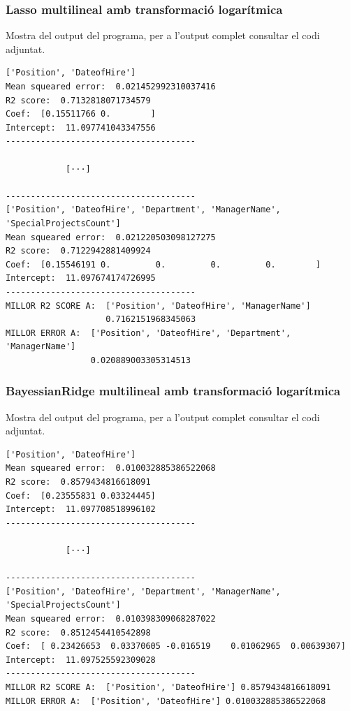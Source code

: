 \documentclass[a4paper, 11pt]{article}
\begin{document}
\subsubsection{Lasso multilineal amb transformació logarítmica}\label{reg_multi_lasso}
Mostra del output del programa, per a l'output complet consultar el codi adjuntat.
\begin{verbatim}
['Position', 'DateofHire']
Mean squeared error:  0.021452992310037416
R2 score:  0.7132818071734579
Coef:  [0.15511766 0.        ]
Intercept:  11.097741043347556
--------------------------------------

            [···]

--------------------------------------
['Position', 'DateofHire', 'Department', 'ManagerName', 'SpecialProjectsCount']
Mean squeared error:  0.021220503098127275
R2 score:  0.7122942881409924
Coef:  [0.15546191 0.         0.         0.         0.        ]
Intercept:  11.097674174726995
--------------------------------------
MILLOR R2 SCORE A:  ['Position', 'DateofHire', 'ManagerName'] 
                    0.7162151968345063
MILLOR ERROR A:  ['Position', 'DateofHire', 'Department', 'ManagerName']
                 0.020889003305314513
\end{verbatim}
\subsubsection{BayessianRidge multilineal amb transformació logarítmica} \label{reg_multi_bay}
Mostra del output del programa, per a l'output complet consultar el codi adjuntat.
\begin{verbatim}
['Position', 'DateofHire']
Mean squeared error:  0.010032885386522068
R2 score:  0.8579434816618091
Coef:  [0.23555831 0.03324445]
Intercept:  11.097708518996102
--------------------------------------

            [···]

--------------------------------------
['Position', 'DateofHire', 'Department', 'ManagerName', 'SpecialProjectsCount']
Mean squeared error:  0.010398309068287022
R2 score:  0.8512454410542898
Coef:  [ 0.23426653  0.03370605 -0.016519    0.01062965  0.00639307]
Intercept:  11.097525592309028
--------------------------------------
MILLOR R2 SCORE A:  ['Position', 'DateofHire'] 0.8579434816618091
MILLOR ERROR A:  ['Position', 'DateofHire'] 0.010032885386522068
\end{verbatim}
\newpage
\end{document}

